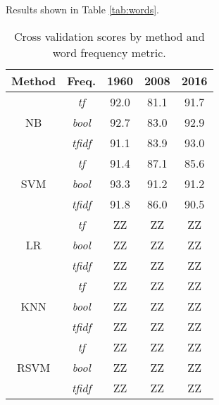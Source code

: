 \documentclass[aps, prl, reprint, showpacs]{revtex4-1}
\begin{document}
Results shown in Table \ref{tab:words}.

\begin{table} %
  \begin{ruledtabular}
  \begin{tabular}{ccccc}
  Method & Freq.& 1960 & 2008 & 2016 \\
    \hline
 & \textit{tf} & 92.0  & 81.1 & 91.7 \\
NB & \textit{bool} & 92.7  & 83.0 & 92.9 \\
 & \textit{tfidf} & 91.1  & 83.9 & 93.0 \\
 \hline
 & \textit{tf} & 91.4 & 87.1 & 85.6 \\
SVM & \textit{bool} & 93.3 & 91.2 & 91.2 \\
 & \textit{tfidf} & 91.8 & 86.0 & 90.5 \\
 \hline
   & \textit{tf} & ZZ  & ZZ & ZZ \\
LR & \textit{bool} & ZZ  & ZZ & ZZ \\
 & \textit{tfidf} & ZZ  & ZZ & ZZ \\
 \hline
   & \textit{tf} & ZZ  & ZZ & ZZ \\
KNN & \textit{bool} & ZZ  & ZZ & ZZ \\
 & \textit{tfidf} & ZZ  & ZZ & ZZ \\
 \hline
  & \textit{tf} & ZZ  & ZZ & ZZ \\
RSVM & \textit{bool} & ZZ  & ZZ & ZZ \\
 & \textit{tfidf} & ZZ  & ZZ & ZZ \\
 \hline
  \end{tabular}
  \end{ruledtabular}
    \caption{Cross validation scores by method and word frequency metric.}
     \label{tab:crossval}
\end{table}
\end{document}
